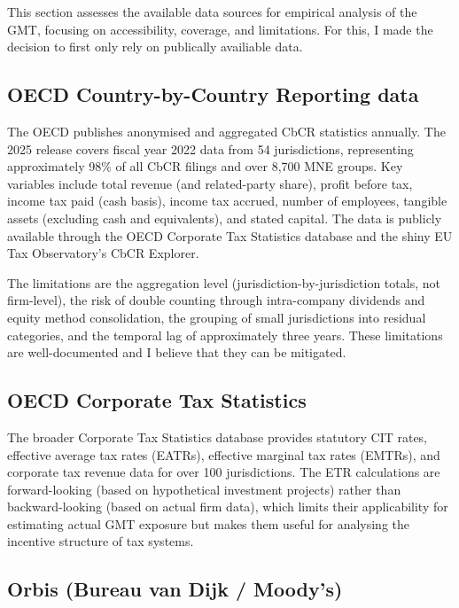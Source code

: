 \documentclass[11pt,a4paper]{article}
\begin{document}
This section assesses the available data sources for empirical analysis of the GMT, focusing on accessibility, coverage, and limitations. For this, I made the decision to first only rely on publically availiable data.

\subsection{OECD Country-by-Country Reporting data}

The OECD publishes anonymised and aggregated CbCR statistics annually. The 2025 release covers fiscal year 2022 data from 54 jurisdictions, representing approximately 98\% of all CbCR filings and over 8,700 MNE groups. Key variables include total revenue (and related-party share), profit before tax, income tax paid (cash basis), income tax accrued, number of employees, tangible assets (excluding cash and equivalents), and stated capital. The data is publicly available through the OECD Corporate Tax Statistics database and the shiny EU Tax Observatory's CbCR Explorer.

The limitations are the aggregation level (jurisdiction-by-jurisdiction totals, not firm-level), the risk of double counting through intra-company dividends and equity method consolidation, the grouping of small jurisdictions into residual categories, and the temporal lag of approximately three years. These limitations are well-documented \citep{oecd2025corptaxstats} and I believe that they can be mitigated.

\subsection{OECD Corporate Tax Statistics}

The broader Corporate Tax Statistics database provides statutory CIT rates, effective average tax rates (EATRs), effective marginal tax rates (EMTRs), and corporate tax revenue data for over 100 jurisdictions. The ETR calculations are forward-looking (based on hypothetical investment projects) rather than backward-looking (based on actual firm data), which limits their applicability for estimating actual GMT exposure but makes them useful for analysing the incentive structure of tax systems.

\subsection{Orbis (Bureau van Dijk / Moody's)}
\end{document}
